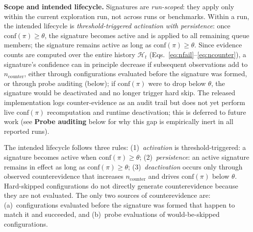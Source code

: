 \documentclass[journal]{IEEEtran}
\begin{document}
\textbf{Scope and intended lifecycle.} Signatures are \emph{run-scoped}: they apply only within the current exploration run, not across runs or benchmarks. Within a run, the intended lifecycle is \emph{threshold-triggered activation with persistence}: once $\text{conf}(\pi) \geq \theta$, the signature becomes active and is applied to all remaining queue members; the signature remains active as long as $\text{conf}(\pi) \geq \theta$. Since evidence counts are computed over the entire history $\mathcal{H}_t$ (Eqs.~\ref{eq:nfail}--\ref{eq:ncounter}), a signature's confidence can in principle decrease if subsequent observations add to $n_{\text{counter}}$, either through configurations evaluated before the signature was formed, or through probe auditing (below); if $\text{conf}(\pi)$ were to drop below $\theta$, the signature would be deactivated and no longer trigger hard skip. The released implementation logs counter-evidence as an audit trail but does not yet perform live $\text{conf}(\pi)$ recomputation and runtime deactivation; this is deferred to future work (see \textbf{Probe auditing} below for why this gap is empirically inert in all reported runs).

The intended lifecycle follows three rules: (1)~\emph{activation} is threshold-triggered: a signature becomes active when $\text{conf}(\pi) \geq \theta$; (2)~\emph{persistence}: an active signature remains in effect as long as $\text{conf}(\pi) \geq \theta$; (3)~\emph{deactivation} occurs only through observed counterevidence that increases $n_{\text{counter}}$ and drives $\text{conf}(\pi)$ below $\theta$. Hard-skipped configurations do not directly generate counterevidence because they are not evaluated. The only two sources of counterevidence are: (a)~configurations evaluated before the signature was formed that happen to match it and succeeded, and (b)~probe evaluations of would-be-skipped configurations.
\end{document}
